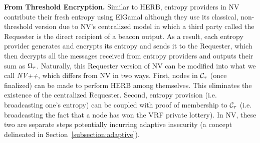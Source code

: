\noindent\textbf{From Threshold Encryption.} Similar to HERB, entropy providers in NV~\cite{nguyen2019scalable} contribute their fresh entropy using ElGamal although they use its classical, non-threshold version due to NV's centralized model in which a third party called the Requester is the direct recipient of a beacon output. As a result, each entropy provider generates and encrypts its entropy and sends it to the Requester, which then decrypts all the messages received from entropy providers and outputs their sum as $\Omega_\tau$. Naturally, this Requester version of NV can be modified into what we call \textit{NV++}, which differs from NV in two ways. First, nodes in $\mathcal{C}_\tau$ (once finalized) can be made to perform HERB among themselves. This eliminates the existence of the centralized Requester. Second, entropy provision (i.e. broadcasting one's entropy) can be coupled with proof of membership to $\mathcal{C}_\tau$ (i.e. broadcasting the fact that a node has won the VRF private lottery). In NV, these two are separate steps potentially incurring adaptive insecurity (a concept delineated in Section~\ref{subsection:adaptive}).

